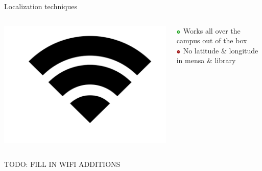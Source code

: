 \documentclass[11pt]{beamer}
\begin{document}
\begin{frame}{Localization techniques}

  \begin{columns}[c]

    \begin{column}{0.2\textwidth}
      \includegraphics[width=\textwidth]{wifi-symbol}
    \end{column}

    \hfill

    \begin{column}{0.8\textwidth}

      \includegraphics[width=0.05\textwidth]{plus} Works all over the campus out of the box\\
      \includegraphics[width=0.05\textwidth]{minus} No latitude \& longitude in mensa \& library

    \end{column}

  \end{columns}

  TODO: FILL IN WIFI ADDITIONS

\end{frame}
\end{document}
